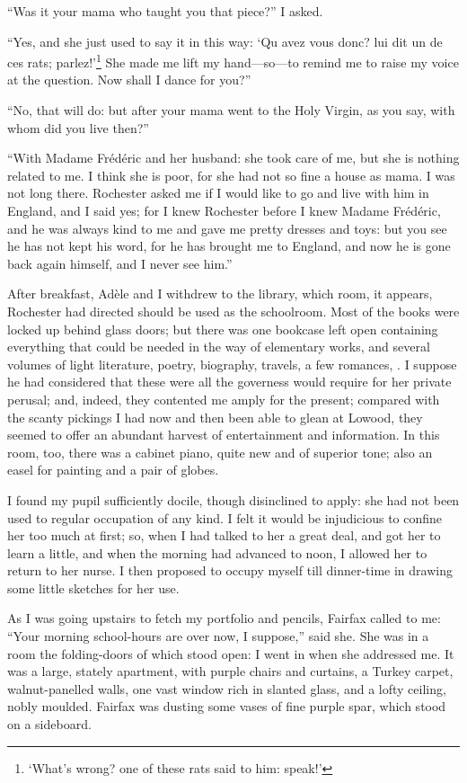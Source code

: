 \enquote{Was it your mama who taught you that piece?} I asked.

\enquote{Yes, and she just used to say it in this way: \foreignquote{french}{Qu
		avez vous donc? lui dit un de ces rats; parlez!}\footnote{%
		\enquote{What's wrong? one of these rats said to him: speak!}}
	She made me lift my hand---so---to remind me to raise my voice at
	the question. Now shall I dance for you?}

\enquote{No, that will do: but after your mama went to the Holy Virgin,
	as you say, with whom did you live then?}

\enquote{With Madame Frédéric and her husband: she took care of me, but
	she is nothing related to me. I think she is poor, for she had not so
	fine a house as mama. I was not long there. \Mr{} Rochester asked me if
	I would like to go and live with him in England, and I said yes; for I
	knew \Mr{} Rochester before I knew Madame Frédéric, and he was always kind
	to me and gave me pretty dresses and toys: but you see he has not kept
	his word, for he has brought me to England, and now he is gone back
	again himself, and I never see him.}

After breakfast, Adèle and I withdrew to the library, which room, it
appears, \Mr{} Rochester had directed should be used as the schoolroom.
Most of the books were locked up behind glass doors; but there was one
bookcase left open containing everything that could be needed in the way
of elementary works, and several volumes of light literature, poetry,
biography, travels, a few romances, \etc. I suppose he had considered
that these were all the governess would require for her private perusal;
and, indeed, they contented me amply for the present; compared with the
scanty pickings I had now and then been able to glean at Lowood, they
seemed to offer an abundant harvest of entertainment and information.
In this room, too, there was a cabinet piano, quite new and of superior
tone; also an easel for painting and a pair of globes.

I found my pupil sufficiently docile, though disinclined to apply: she
had not been used to regular occupation of any kind. I felt it would be
injudicious to confine her too much at first; so, when I had talked to
her a great deal, and got her to learn a little, and when the morning
had advanced to noon, I allowed her to return to her nurse. I then
proposed to occupy myself till dinner-time in drawing some little
sketches for her use.

As I was going upstairs to fetch my portfolio and pencils, \Mrs{} Fairfax
called to me: \enquote{Your morning school-hours are over now, I
	suppose,} said she. She was in a room the folding-doors of which stood
open: I went in when she addressed me. It was a large, stately
apartment, with purple chairs and curtains, a Turkey carpet,
walnut-panelled walls, one vast window rich in slanted glass, and a
lofty ceiling, nobly moulded. \Mrs{} Fairfax was dusting some vases of
fine purple spar, which stood on a sideboard.

